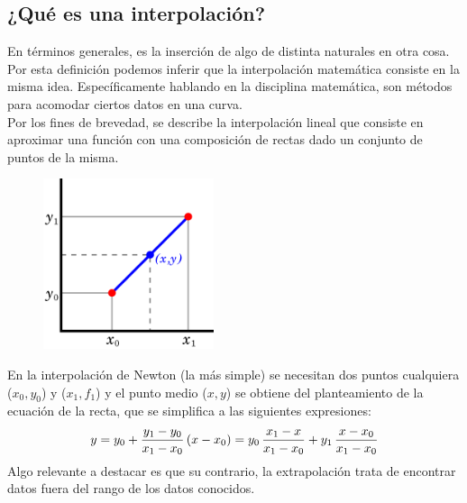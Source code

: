 \documentclass[letterpaper, 12pt]{article}
\begin{document}
\thispagestyle{fancy}
\subsection*{¿Qué es una interpolación?}
\justify
En términos generales, es la inserción de algo de distinta naturales en otra cosa. Por esta definición podemos inferir que la interpolación matemática
consiste en la misma idea. Específicamente hablando en la disciplina matemática, son métodos para acomodar ciertos datos en una curva. 
\\\newline
Por los fines de brevedad, se describe la interpolación lineal que consiste en aproximar una función con una composición de rectas dado un conjunto de puntos de la misma.
\begin{figure}[H]
        \centering
        \includegraphics[width=5cm,height=5cm]{450px-LinearInterpolation.png}
\end{figure}
\justify
En la interpolación de Newton (la más simple) se necesitan dos puntos cualquiera (\(x_0, y_0\)) y (\(x_1, f_1\)) y el punto medio (\(x,y\)) se obtiene del planteamiento
de la ecuación de la recta, que se simplifica a las siguientes expresiones:
{\large\[y=y_0+{y_1 - y_0\over x_1-x_0}\,(x-x_0)=y_0\,{x_1-x\over x_1-x_0}+y_1\,{x-x_0\over x_1-x_0}\]}
\justify
Algo relevante a destacar es que su contrario, la extrapolación trata de encontrar datos fuera del rango de los datos conocidos.
\end{document}
